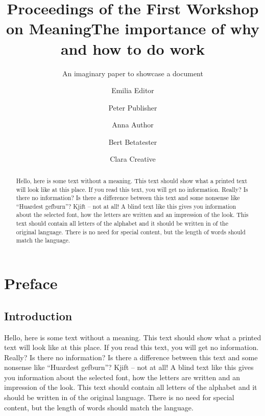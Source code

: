 \documentclass[%
  english,%
  todotools=true,%
  trtype=proceedings%
]{hpitr}
\begin{document}
\title{Proceedings of the First Workshop on Meaning}
\author{Emilia Editor\and Peter Publisher}
\maketitle
\frontmatter
\chapter*{Preface}
\blindtext[2]
\tableofcontents
\lstlistoflistings
\mainmatter

\title{The importance of why and how to do work}
\subtitle{An imaginary paper to showcase a document}
\author{Anna Author\and Bert Betatester\and Clara Creative}
\maketitle

\begin{abstract}
  Hello, here is some text without a meaning. This text should show
  what a printed text will look like at this place. If you read this
  text, you will get no information. Really? Is there no
  information? Is there a difference between this text and some
  nonsense like “Huardest gefburn”? Kjift – not at all! A blind text
  like this gives you information about the selected font, how the
  letters are written and an impression of the look. This text
  should contain all letters of the alphabet and it should be
  written in of the original language. There is no need for special
  content, but the length of words should match the language.
\end{abstract}


\section{Introduction}
\label{sec:introduction}

Hello, here is some text without a meaning. This text should show
what a printed text will look like at this place. If you read this
text, you will get no information. Really? Is there no information?
Is there a difference between this text and some nonsense like
“Huardest gefburn”? Kjift – not at all! A blind text like this gives
you information about the selected font, how the letters are written
and an impression of the look. This text should contain all letters
of the alphabet and it should be written in of the original
language. There is no need for special content, but the length of
words should match the language.
\end{document}
